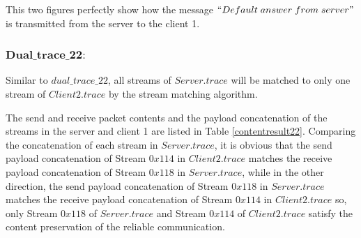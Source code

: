 \documentclass[12pt,oneside]{book}
\begin{document}
This two figures perfectly show how the message $``Default\; answer\; from\; server"$ is transmitted from the server to the client 1.

\subsubsection{$\boldsymbol{Dual\_trace\_22:}$}
Similar to $dual\_trace\_22$, all streams of $Server.trace$ will be matched to only one stream of $Client2.trace$ by the stream matching algorithm.

The send and receive packet contents and the payload concatenation of the streams in the server and client 1 are listed in Table \ref{contentresult22}. Comparing the concatenation of each stream in $Server.trace$, it is obvious that the send payload concatenation of Stream $0x114$ in $Client2.trace$ matches the receive payload concatenation of Stream $0x118$ in $Server.trace$, while in the other direction, the send payload concatenation of Stream $0x118$ in $Server.trace$ matches the receive payload concatenation of Stream $0x114$ in $Client2.trace$ so, only Stream $0x118$ of $Server.trace$ and Stream $0x114$ of $Client2.trace$ satisfy the content preservation of the reliable communication. 
\end{document}
